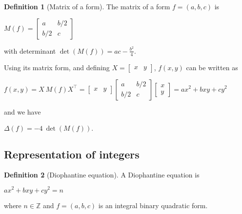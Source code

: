 \documentclass{article}
\theoremstyle{definition}
\newtheorem{definition}{Definition}[section]
\theoremstyle{theorem}
\theoremstyle{example}
\theoremstyle{corollary}
\begin{document}
\bigskip

\theoremstyle{definition}
\begin{definition}[Matrix of a form]
The matrix of a form \(f = (a, b, c)\) is
\begin{center}
\(M(f) = \begin{bmatrix} a & b/2 \\ b/2 & c \end{bmatrix}\)
\end{center}
with determinant \(\det(M(f)) = ac - \frac{b^{2}}{4}\).
\end{definition}

\bigskip

Using its matrix form, and defining \(X = \begin{bmatrix} x & y \end{bmatrix}\), \(f(x, y)\) can be written as

\begin{center}
\(f(x, y) = X \ M(f) X^{\top} = \begin{bmatrix} x & y \end{bmatrix} \begin{bmatrix} a & b/2 \\ b/2 & c \end{bmatrix} \begin{bmatrix} x \\ y \end{bmatrix} = a x^{2} + b xy + c y^{2}\)
\end{center}

and we have

\begin{center}
\(\Delta(f) = -4 \ \det(M(f))\).
\end{center}

\bigskip




\subsection{Representation of integers}

\bigskip

\theoremstyle{definition}
\begin{definition}[Diophantine equation]
A Diophantine equation is
\begin{center}
\(a x^{2} + b x y + c y^{2} = n\)
\end{center}
where \(n \in \mathbb{Z}\) and \(f = (a, b, c)\) is an integral binary quadratic form.
\end{definition}
\end{document}
